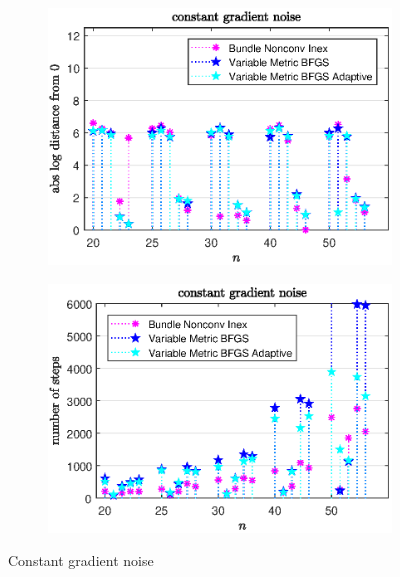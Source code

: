 \begin{figure}[H]
	\begin{subfigure}{0.49\textwidth}
		\includegraphics[width=\textwidth]{Pictures/Plots/constant_gradient_noise_b.eps}%
	\end{subfigure}
	\begin{subfigure}{0.49\textwidth}
		\includegraphics[width=\textwidth]{Pictures/Plots/steps_constant_gradient_noise_b.eps}%
	\end{subfigure}
	\caption{Constant gradient noise}%
	\label{fig_const_grad_noise_large}%
\end{figure}

